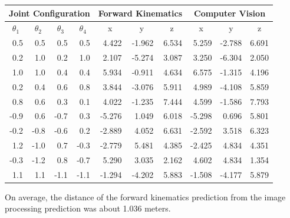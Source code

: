 \documentclass[11pt]{article}
\begin{document}
\begin{center}
    \begin{tabular}{ |r|r|r|r||r|r|r|r|r|r|} \hline
        \multicolumn{4}{|c||}{Joint Configuration} & \multicolumn{3}{|c|}{Forward Kinematics} & \multicolumn{3}{|c|}{Computer Vision} \\ \hline
        \multicolumn{1}{|c|}{$\theta_1$} & \multicolumn{1}{|c|}{$\theta_2$} & \multicolumn{1}{|c|}{$\theta_3$} & \multicolumn{1}{|c||}{$\theta_4$} & \multicolumn{1}{|c|}{x} & \multicolumn{1}{|c|}{y} & \multicolumn{1}{|c|}{z} & \multicolumn{1}{|c|}{x} & \multicolumn{1}{|c|}{y} & \multicolumn{1}{|c|}{z} \\ \hline
         0.5 &  0.5 &  0.5 &  0.5 &  4.422 & -1.962 & 6.534 & 5.259 & -2.788 & 6.691 \\
         0.2 &  1.0 &  0.2 &  1.0 &  2.107 & -5.274 & 3.087 & 3.250 & -6.304 & 2.050 \\
         1.0 &  1.0 &  0.4 &  0.4 &  5.934 & -0.911 & 4.634 & 6.575 & -1.315 & 4.196 \\
         0.2 &  0.4 &  0.6 &  0.8 &  3.844 & -3.076 & 5.911 & 4.989 & -4.108 & 5.859 \\
         0.8 &  0.6 &  0.3 &  0.1 &  4.022 & -1.235 & 7.444 & 4.599 & -1.586 & 7.793 \\
        -0.9 &  0.6 & -0.7 &  0.3 & -5.276 &  1.049 & 6.018 & -5.298 & 0.696 & 5.801 \\
        -0.2 & -0.8 & -0.6 &  0.2 & -2.889 &  4.052 & 6.631 & -2.592 & 3.518 & 6.323 \\
         1.2 & -1.0 &  0.7 & -0.3 & -2.779 &  5.481 & 4.385 & -2.425 & 4.834 & 4.351 \\
        -0.3 & -1.2 &  0.8 & -0.7 &  5.290 &  3.035 & 2.162 & 4.602 & 4.834 & 1.354  \\
         1.1 &  1.1 & -1.1 & -1.1 & -1.294 & -4.202 & 5.883 & -1.508 & -4.177 & 5.879 \\ \hline
    \end{tabular}
\end{center}

On average, the distance of the forward kinematics prediction from the image processing prediction was about 1.036 meters.
\end{document}
